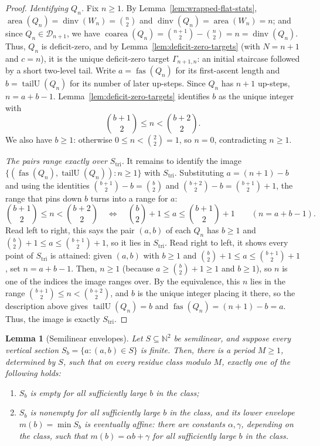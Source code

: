 \documentclass[11pt]{article}
\newtheorem{lemma}[theorem]{Lemma}
\theoremstyle{definition}
\newcommand{\D}{\mathcal D}
\newcommand{\N}{\mathbb N}
\newcommand{\area}{\operatorname{area}}
\newcommand{\dinv}{\operatorname{dinv}}
\newcommand{\coarea}{\operatorname{coarea}}
\newcommand{\fas}{\operatorname{fas}}
\newcommand{\tailU}{\operatorname{tailU}}
\begin{document}
\begin{proof}
\emph{Identifying $Q_n$.}
Fix $n\ge 1$.  By Lemma~\ref{lem:wrapped-flat-stats},
$\area(Q_n)=\dinv(W_n)=\binom n2$ and $\dinv(Q_n)=\area(W_n)=n$; and since
$Q_n\in\D_{n+1}$, we have
$\coarea(Q_n)=\binom{n+1}{2}-\binom n2=n=\dinv(Q_n)$.  Thus, $Q_n$ is
deficit-zero, and by Lemma~\ref{lem:deficit-zero-targets} (with
$N=n+1$ and $c=n$), it is the unique deficit-zero target $\Gamma_{n+1,n}$: an
initial staircase followed by a short two-level tail.  Write $a=\fas(Q_n)$ for
its first-ascent length and
$b=\tailU(Q_n)$ for its number of later up-steps.  Since $Q_n$ has $n+1$
up-steps, $n=a+b-1$.
Lemma~\ref{lem:deficit-zero-targets} identifies $b$ as the unique integer with
\[
   \binom{b+1}{2}\le n<\binom{b+2}{2}.
\]
We also have $b\ge1$: otherwise $0\le n<\binom22=1$, so $n=0$, contradicting
$n\ge1$.
 
\vspace{0.5em}
\noindent\emph{The pairs range exactly over $S_{\mathrm{tri}}$.}
It remains to identify the image $\{(\fas(Q_n),\tailU(Q_n)):n\ge 1\}$ with
$S_{\mathrm{tri}}$.  Substituting $a=(n+1)-b$ and using the identities
$\binom{b+1}{2}-b=\binom b2$ and $\binom{b+2}{2}-b=\binom{b+1}{2}+1$, the range
that pins down $b$ turns into a range for $a$:
\[
   \binom{b+1}{2}\le n<\binom{b+2}{2}
   \quad\Longleftrightarrow\quad
   \binom b2+1\le a\le\binom{b+1}{2}+1
   \qquad(n=a+b-1).
\]
Read left to right, this says the pair $(a,b)$ of each $Q_n$ has $b\ge 1$ and
$\binom b2+1\le a\le\binom{b+1}{2}+1$, so it lies in $S_{\mathrm{tri}}$.  Read
right to left, it shows every point of $S_{\mathrm{tri}}$ is attained: given
$(a,b)$ with $b\ge 1$ and $\binom b2+1\le a\le\binom{b+1}{2}+1$, set $n=a+b-1$.
Then, $n\ge 1$ (because $a\ge\binom b2+1\ge 1$ and $b\ge 1$), so $n$ is one of the
indices the image ranges over.  By the equivalence, this $n$ lies in the range
$\binom{b+1}{2}\le n<\binom{b+2}{2}$, and $b$ is the unique integer placing it
there, so the description above gives $\tailU(Q_n)=b$ and
$\fas(Q_n)=(n+1)-b=a$.  Thus, the image is exactly $S_{\mathrm{tri}}$.
\end{proof}

\begin{lemma}[Semilinear envelopes]
\label{lem:semilinear-envelope}
Let $S\subseteq\N^2$ be semilinear, and suppose every vertical section
$S_b=\{a:(a,b)\in S\}$ is finite.  Then, there is a period $M\ge1$, determined
by $S$, such that on every residue class modulo $M$, exactly one of the following
holds:
\begin{enumerate}[label=(\roman*)]
\item $S_b$ is empty for all sufficiently large $b$ in the class;
\item $S_b$ is nonempty for all sufficiently large $b$ in the class, and its
lower envelope $m(b)=\min S_b$ is \emph{eventually affine}: there are constants
$\alpha,\gamma$, depending on the class, such that
$m(b)=\alpha b+\gamma$ for all sufficiently large $b$ in the class.
\end{enumerate}
\end{lemma}
\end{document}
